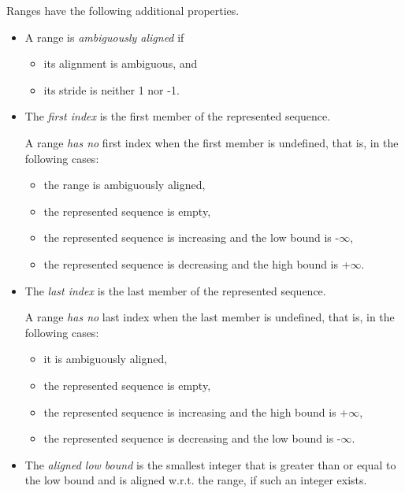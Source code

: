 Ranges have the following additional properties.
\begin{itemize}

\item A range is \emph{ambiguously aligned} if
  \begin{itemize}
  \item its alignment is ambiguous, and
  \item its stride is neither 1 nor -1.
  \end{itemize}

\item The \emph{first index} is the first member of the represented sequence.

  A range \emph{has no} first index when the first member is undefined,
  that is, in the following cases:
  \begin{itemize}
  \item the range is ambiguously aligned,
  \item the represented sequence is empty,
  \item the represented sequence is increasing and the low bound is -$\infty$,
  \item the represented sequence is decreasing and the high bound is +$\infty$.
  \end{itemize}

\item The \emph{last index} is the last member of the represented sequence.

  A range \emph{has no} last index when the last member is undefined,
  that is, in the following cases:
  \begin{itemize}
  \item it is ambiguously aligned,
  \item the represented sequence is empty,
  \item the represented sequence is increasing and the high bound is +$\infty$,
  \item the represented sequence is decreasing and the low bound is -$\infty$.
  \end{itemize}

\item The \emph{aligned low bound} is the smallest integer that is
  greater than or equal to the low bound and is aligned w.r.t. the range,
  if such an integer exists.


\end{itemize}
